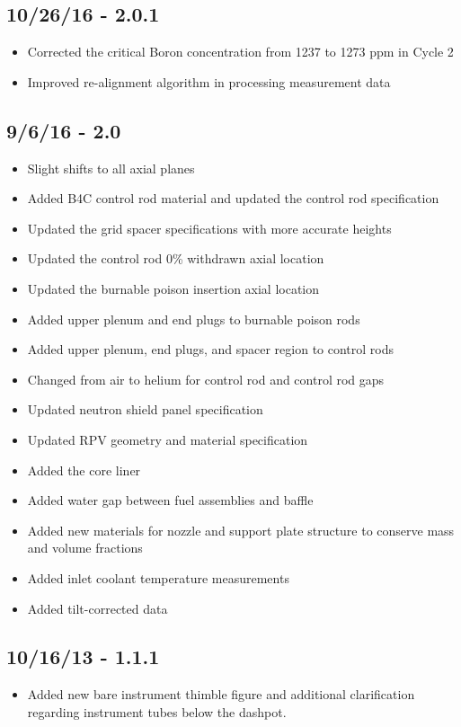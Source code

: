 \subsection*{10/26/16 - 2.0.1}
\begin{itemize}
  \item Corrected the critical Boron concentration from 1237 to 1273 ppm in Cycle 2
  \item Improved re-alignment algorithm in processing measurement data
\end{itemize}

\subsection*{9/6/16 - 2.0}
\begin{itemize}
  \item Slight shifts to all axial planes
  \item Added B4C control rod material and updated the control rod specification
  \item Updated the grid spacer specifications with more accurate heights
  \item Updated the control rod 0\% withdrawn axial location
  \item Updated the burnable poison insertion axial location
  \item Added upper plenum and end plugs to burnable poison rods
  \item Added upper plenum, end plugs, and spacer region to control rods
  \item Changed from air to helium for control rod and control rod gaps
  \item Updated neutron shield panel specification
  \item Updated RPV geometry and material specification
  \item Added the core liner
  \item Added water gap between fuel assemblies and baffle
  \item Added new materials for nozzle and support plate structure to conserve
        mass and volume fractions
  \item Added inlet coolant temperature measurements
  \item Added tilt-corrected data
\end{itemize}

\subsection*{10/16/13 - 1.1.1}
\begin{itemize}
  \item Added new bare instrument thimble figure and additional clarification
  regarding instrument tubes below the dashpot.
\end{itemize}

